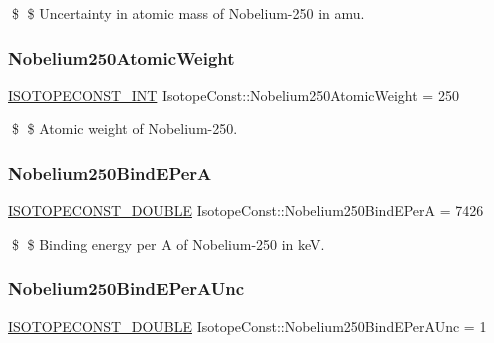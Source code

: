 \$ \$ Uncertainty in atomic mass of Nobelium-\/250 in amu. \mbox{\label{group___isotope_const-_nobelium-_no250_ga2cb6511f256c1b61fb2fbdb12ac473c5}} 
\subsubsection{\texorpdfstring{Nobelium250\+Atomic\+Weight}{Nobelium250AtomicWeight}}
{\footnotesize\ttfamily \mbox{\hyperlink{group___isotope_const-_macros_ga5f18360b3e99483a35c32d789e62621c}{I\+S\+O\+T\+O\+P\+E\+C\+O\+N\+S\+T\+\_\+\+I\+NT}} Isotope\+Const\+::\+Nobelium250\+Atomic\+Weight = 250}

\$ \$ Atomic weight of Nobelium-\/250. \mbox{\label{group___isotope_const-_nobelium-_no250_gaa93d5bc35cdab0be717eece67b27936d}} 
\subsubsection{\texorpdfstring{Nobelium250\+Bind\+E\+PerA}{Nobelium250BindEPerA}}
{\footnotesize\ttfamily \mbox{\hyperlink{group___isotope_const-_macros_ga8f45a7272ce02c0b4c65c44636ed719a}{I\+S\+O\+T\+O\+P\+E\+C\+O\+N\+S\+T\+\_\+\+D\+O\+U\+B\+LE}} Isotope\+Const\+::\+Nobelium250\+Bind\+E\+PerA = 7426}

\$ \$ Binding energy per A of Nobelium-\/250 in keV. \mbox{\label{group___isotope_const-_nobelium-_no250_ga4a71bb85349cd9c451ec697878708468}} 
\subsubsection{\texorpdfstring{Nobelium250\+Bind\+E\+Per\+A\+Unc}{Nobelium250BindEPerAUnc}}
{\footnotesize\ttfamily \mbox{\hyperlink{group___isotope_const-_macros_ga8f45a7272ce02c0b4c65c44636ed719a}{I\+S\+O\+T\+O\+P\+E\+C\+O\+N\+S\+T\+\_\+\+D\+O\+U\+B\+LE}} Isotope\+Const\+::\+Nobelium250\+Bind\+E\+Per\+A\+Unc = 1}

